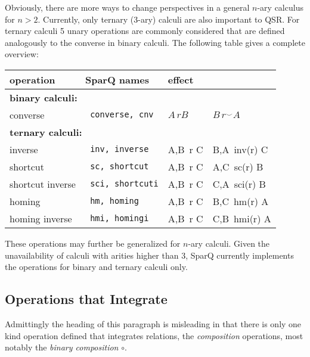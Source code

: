 \documentclass[headsepline]{scrreprt}
\theoremstyle{definition}
\newcommand{\engine}{SparQ}
\begin{document}
Obviously, there are more ways to change perspectives in a general $n$-ary calculus for $n>2$. Currently, only ternary (3-ary) calculi are also important to QSR. For ternary calculi 5 unary operations are commonly considered that are defined analogously to the converse in  binary calculi. The following table gives a complete overview:

\begin{center}
\begin{tabular}{|lll@{ $\leadsto$ }l|} \hline
{\bfseries operation} & {\bfseries \engine{} names} & \multicolumn{2}{l|}{{\bfseries effect}}\\ \hline \hline
%
\multicolumn{4}{|l|}{\bfseries binary calculi:}\\
converse & \texttt{ converse, cnv} & $A\, r B$ & $B\, r^{\smile} A$\\[1ex] \hline
%
\multicolumn{4}{|l|}{\bfseries ternary calculi:}\\
%
inverse & \texttt{ inv, inverse} & A,B\, r  C & B,A\, inv(r) C\\
shortcut & \texttt{ sc, shortcut} & A,B\, r  C & A,C\, sc(r) B\\
shortcut inverse & \texttt{ sci, shortcuti} & A,B\, r  C & C,A\, sci(r) B\\
homing & \texttt{ hm, homing} & A,B\, r C & B,C\, hm(r) A\\
homing inverse & \texttt{ hmi, homingi} & A,B\, r  C & C,B\, hmi(r) A\\ \hline
\end{tabular}
\end{center}

These operations may further be generalized for $n$-ary calculi.
Given the unavailability of calculi with arities higher than 3, SparQ currently implements the operations for binary and ternary calculi only.

\subsection{Operations that Integrate}
Admittingly the heading of this paragraph is misleading in that there is only one kind operation defined that integrates relations, the {\em composition} operations, most notably the {\em binary composition} $\circ$.
\end{document}
